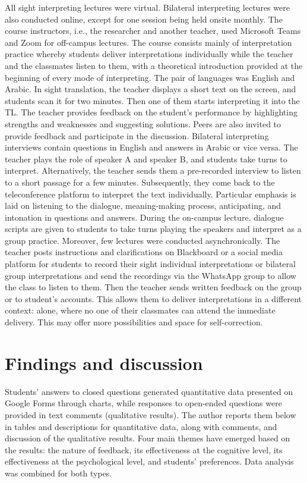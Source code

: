 \documentclass[english]{textolivre}
\begin{document}
All sight interpreting lectures were virtual. Bilateral interpreting lectures were also conducted online, except for one session being held onsite monthly. The course instructors, i.e., the researcher and another teacher, used Microsoft Teams and Zoom for off-campus lectures. The course consists mainly of interpretation practice whereby students deliver interpretations individually while the teacher and the classmates listen to them, with a theoretical introduction provided at the beginning of every mode of interpreting. The pair of languages was English and Arabic. In sight translation, the teacher displays a short text on the screen, and students scan it for two minutes. Then one of them starts interpreting it into the TL. The teacher provides feedback on the student’s performance by highlighting strengths and weaknesses and suggesting solutions. Peers are also invited to provide feedback and participate in the discussion. Bilateral interpreting interviews contain questions in English and answers in Arabic or vice versa. The teacher plays the role of speaker A and speaker B, and students take turns to interpret. Alternatively, the teacher sends them a pre-recorded interview to listen to a short passage for a few minutes. Subsequently, they come back to the teleconference platform to interpret the text individually. Particular emphasis is laid on listening to the dialogue, meaning-making process, anticipating, and intonation in questions and answers. During the on-campus lecture, dialogue scripts are given to students to take turns playing the speakers and interpret as a group practice. Moreover, few lectures were conducted asynchronically. The teacher posts instructions and clarifications on Blackboard or a social media platform for students to record their sight individual interpretations or bilateral group interpretations and send the recordings via the WhatsApp group to allow the class to listen to them. Then the teacher sends written feedback on the group or to student’s accounts. This allows them to deliver interpretations in a different context: alone, where no one of their classmates can attend the immediate delivery. This may offer more possibilities and space for self-correction.

\section{Findings and discussion}\label{sec-conduta}
Students’ answers to closed questions generated quantitative data presented on Google Forms through charts, while responses to open-ended questions were provided in text comments (qualitative results). The author reports them below in tables and descriptions for quantitative data, along with comments, and discussion of the qualitative results. Four main themes have emerged based on the results: the nature of feedback, its effectiveness at the cognitive level, its effectiveness at the psychological level, and students’ preferences. Data analysis was combined for both types.
\end{document}

